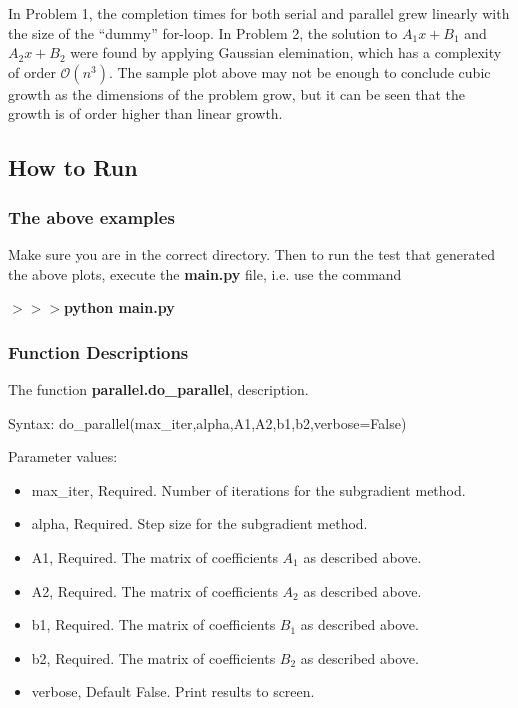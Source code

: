 \documentclass[12pt]{article}
\begin{document}
In Problem 1, the completion times for both serial and parallel grew linearly with the size of the ``dummy'' for-loop. In Problem 2, the solution to $A_1x+B_1$ and $A_2x+B_2$ were found by applying Gaussian elemination, which has a complexity of order $\mathcal{O}(n^3)$. The sample plot above may not be enough to conclude cubic growth as the dimensions of the problem grow, but it can be seen that the growth is of order higher than linear growth.


\subsection*{How to Run}

\subsubsection*{The above examples}

Make sure you are in the correct directory. Then to run the test that generated the above plots, execute the \textbf{main.py} file, i.e. use the command

\noindent \textbf{$>>>$python main.py}

\subsubsection*{Function Descriptions}

The function \textbf{parallel.do\_parallel}, description.

Syntax: do\_parallel(max\_iter,alpha,A1,A2,b1,b2,verbose=False)

Parameter values:
\begin{itemize}
	\item max\_iter, Required. Number of iterations for the subgradient method.
	\item alpha, Required. Step size for the subgradient method.
	\item A1, Required. The matrix of coefficients $A_1$ as described above.
	\item A2, Required. The matrix of coefficients $A_2$ as described above.
	\item b1, Required. The matrix of coefficients $B_1$ as described above.
	\item b2, Required. The matrix of coefficients $B_2$ as described above.
	\item verbose, Default False. Print results to screen.
\end{itemize}
\end{document}
